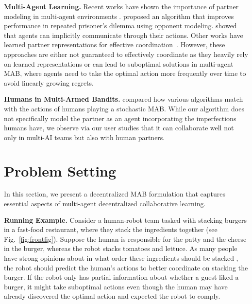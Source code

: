 \documentclass[letterpaper]{article} %
\theoremstyle{definition}
\begin{document}
\smallskip
\noindent\textbf{Multi-Agent Learning.}
Recent works have shown the importance of partner modeling in multi-agent environments \cite{devin2016implemented,zhu2020multi}. \citet{foerster2018learning} proposed an algorithm that
improves performance in repeated prisoner's dilemma using opponent modeling.
\citet{losey2020learning} showed that agents can implicitly communicate through their actions. Other works have learned partner representations for effective coordination~\cite{shih2021critical,xie2020learning,grover2018learning}.
However, these approaches are either not guaranteed to effectively coordinate as they heavily rely on learned representations or can lead to suboptimal solutions in multi-agent MAB, where agents need to take the optimal action more frequently over time to avoid linearly growing regrets.


\smallskip
\noindent\textbf{Humans in Multi-Armed Bandits.}
\citet{zhang2013cheap} compared how various algorithms match with the actions of humans playing a stochastic MAB.
While our algorithm does not specifically model the partner as an agent incorporating the imperfections humans have, we observe via our user studies that it can collaborate well not only in multi-AI teams but also with human partners.








\section{Problem Setting}
\label{sec:problem}
In this section, we present a decentralized MAB formulation that captures essential aspects of multi-agent decentralized collaborative learning.

\smallskip
\noindent\textbf{Running Example.} Consider a human-robot team tasked with stacking burgers in a fast-food restaurant, where they stack the ingredients together (see Fig.~\ref{fig:frontfig}). Suppose the human is responsible for the patty and the cheese in the burger, whereas the robot stacks tomatoes and lettuce. As many people have strong opinions about in what order these ingredients should be stacked \cite{burger_blog}, the robot should predict the human's actions to better coordinate on stacking the burger.
If the robot only has partial information about whether a guest liked a burger, it might take suboptimal actions even though the human may have already discovered the optimal action and expected the robot to comply.
\end{document}
